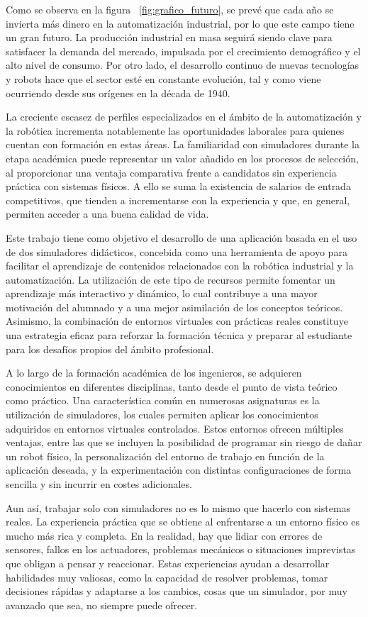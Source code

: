 Como se observa en la figura  ~\ref{fig:grafico_futuro}, se prevé que cada año se invierta más dinero en la automatización industrial,
por lo que este campo tiene un gran futuro. La producción industrial en masa seguirá siendo clave para satisfacer la demanda del mercado, impulsada por el crecimiento demográfico y el alto nivel de consumo. Por otro lado, el desarrollo continuo de nuevas tecnologías y robots hace que el sector esté en constante evolución, tal y como viene ocurriendo desde sus orígenes en la década de 1940.

La creciente escasez de perfiles especializados en el ámbito de la automatización y la robótica incrementa notablemente las oportunidades laborales para quienes cuentan con formación en estas áreas. La familiaridad con simuladores durante la etapa académica puede representar un valor añadido en los procesos de selección, al proporcionar una ventaja comparativa frente a candidatos sin experiencia práctica con sistemas físicos. A ello se suma la existencia de salarios de entrada competitivos, que tienden a incrementarse con la experiencia y que, en general, permiten acceder a una buena calidad de vida.

Este trabajo tiene como objetivo el desarrollo de una aplicación basada en el uso de dos simuladores didácticos, concebida como una herramienta de apoyo para facilitar el aprendizaje de contenidos relacionados con la robótica industrial y la automatización. La utilización de este tipo de recursos permite fomentar un aprendizaje más interactivo y dinámico, lo cual contribuye a una mayor motivación del alumnado y a una mejor asimilación de los conceptos teóricos. Asimismo, la combinación de entornos virtuales con prácticas reales constituye una estrategia eficaz para reforzar la formación técnica y preparar al estudiante para los desafíos propios del ámbito profesional.

A lo largo de la formación académica de los ingenieros, se adquieren conocimientos en diferentes disciplinas, tanto desde el punto de vista teórico como práctico. Una característica común en numerosas asignaturas es la utilización de simuladores, los cuales permiten aplicar los conocimientos adquiridos en entornos virtuales controlados. Estos entornos ofrecen múltiples ventajas, entre las que se incluyen la posibilidad de programar sin riesgo de dañar un robot físico, la personalización del entorno de trabajo en función de la aplicación deseada, y la experimentación con distintas configuraciones de forma sencilla y sin incurrir en costes adicionales.

Aun así, trabajar solo con simuladores no es lo mismo que hacerlo con sistemas reales. La experiencia práctica que se obtiene al enfrentarse a un entorno físico es mucho más rica y completa. En la realidad, hay que lidiar con errores de sensores, fallos en los actuadores, problemas mecánicos o situaciones imprevistas que obligan a pensar y reaccionar. Estas experiencias ayudan a desarrollar habilidades muy valiosas, como la capacidad de resolver problemas, tomar decisiones rápidas y adaptarse a los cambios, cosas que un simulador, por muy avanzado que sea, no siempre puede ofrecer.
